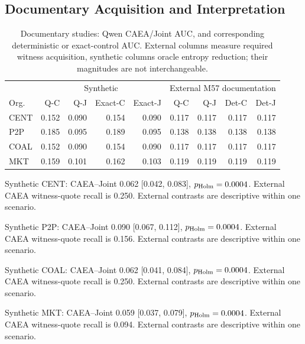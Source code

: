 \subsection{Documentary Acquisition and Interpretation}

\begin{table}[t]\centering\small

\caption{Documentary studies: Qwen CAEA/Joint AUC, and corresponding deterministic or exact-control AUC. External columns measure required witness acquisition, synthetic columns oracle entropy reduction; their magnitudes are not interchangeable.}

\begin{tabular}{lrrrrrrrr}\toprule & \multicolumn{4}{c}{Synthetic} & \multicolumn{4}{c}{External M57 documentation}\\ Org. & Q-C & Q-J & Exact-C & Exact-J & Q-C & Q-J & Det-C & Det-J\\\midrule

CENT & 0.152 & 0.090 & 0.154 & 0.090 & 0.117 & 0.117 & 0.117 & 0.117\\

P2P & 0.185 & 0.095 & 0.189 & 0.095 & 0.138 & 0.138 & 0.138 & 0.138\\

COAL & 0.152 & 0.090 & 0.154 & 0.090 & 0.117 & 0.117 & 0.117 & 0.117\\

MKT & 0.159 & 0.101 & 0.162 & 0.103 & 0.119 & 0.119 & 0.119 & 0.119\\

\bottomrule\end{tabular}\end{table}

Synthetic CENT: CAEA--Joint 0.062 [0.042, 0.083], $p_{\rm Holm}=0.0004$. External CAEA witness-quote recall is 0.250. External contrasts are descriptive within one scenario.

Synthetic P2P: CAEA--Joint 0.090 [0.067, 0.112], $p_{\rm Holm}=0.0004$. External CAEA witness-quote recall is 0.156. External contrasts are descriptive within one scenario.

Synthetic COAL: CAEA--Joint 0.062 [0.041, 0.084], $p_{\rm Holm}=0.0004$. External CAEA witness-quote recall is 0.250. External contrasts are descriptive within one scenario.

Synthetic MKT: CAEA--Joint 0.059 [0.037, 0.079], $p_{\rm Holm}=0.0004$. External CAEA witness-quote recall is 0.094. External contrasts are descriptive within one scenario.

